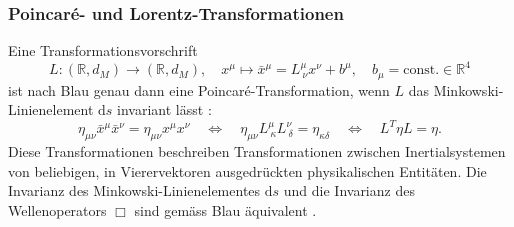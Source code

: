 \documentclass[a4paper,12pt]{article}
\numberwithin{equation}{section}
\begin{document}
\subsubsection{Poincaré- und Lorentz-Transformationen}
Eine Transformationsvorschrift \begin{equation}
L:(\mathbb{R},d_M) \rightarrow (\mathbb{R},d_M), \quad x^\mu \mapsto \bar{x}^\mu = L^\mu_{\ \nu}x^\nu + b^\mu, \quad b_\mu = \text{const.} \in \mathbb{R}^4
\end{equation} ist nach Blau genau dann eine Poincaré-Transformation, wenn $L$ das Minkowski-Linienelement $\mathrm{d}s$ invariant lässt \cite[S.14]{Blau.2021}:
\begin{equation}
\eta_{\mu\nu}\bar{x}^\mu\bar{x}^\nu = \eta_{\mu\nu}x^\mu x^\nu \quad \Leftrightarrow \quad \eta_{\mu\nu} L^\mu_{\ \kappa}L^\nu_{\ \delta} = \eta_{\kappa \delta} \quad \Leftrightarrow \quad L^T\eta L = \eta.
\end{equation} Diese Transformationen beschreiben Transformationen zwischen Inertialsystemen von beliebigen, in Vierervektoren ausgedrückten physikalischen Entitäten. Die Invarianz des Minkowski-Linienelementes $\mathrm{d}s$ und die Invarianz des Wellenoperators $\Box$ sind gemäss Blau äquivalent \cite[S.14]{Blau.2021}.
\end{document}
